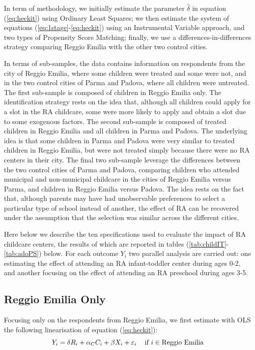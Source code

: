 \documentclass[12pt]{article}
\begin{document}
In term of methodology, we initially estimate the parameter $\hat{\delta}$ in equation (\ref{eq:heckit}) using Ordinary Least Squares; we then estimate the system of equations (\ref{eq:1stage}-\ref{eq:heckit}) using an Instrumental Variable approach, and two types of Propensity Score Matching; finally, we use a differences-in-differences strategy comparing Reggio Emilia with the other two control cities.

In terms of sub-samples, the data contains information on respondents from the city of Reggio Emilia, where some children were treated and some were not, and in the two control cities of Parma and Padova, where all children were untreated. The first sub-sample is composed of children in Reggio Emilia only. The identification strategy rests on the idea that, although all children could apply for a slot in the RA childcare, some were more likely to apply and obtain a slot due to some exogenous factors. The second sub-sample is composed of treated children in Reggio Emilia and all children in Parma and Padova. The underlying idea is that some children in Parma and Padova were very similar to treated children in Reggio Emilia, but were not treated simply because there were no RA centers in their city. The final two sub-sample leverage the differences between the two control cities of Parma and Padova, comparing children who attended municipal and non-municipal childcare in the cities of Reggio Emilia versus Parma, and children in Reggio Emilia versus Padova. The idea rests on the fact that, although parents may have had unobservable preferences to select a particular type of school instead of another, the effect of RA can be recovered under the assumption that the selection was similar across the different cities.

Here below we describe the ten specifications used to evaluate the impact of RA childcare centers, the results of which are reported in tables (\ref{tab:childIT}-\ref{tab:adoPS}) below. For each outcome $Y_{i}$ two parallel analysis are carried out: one estimating the effect of attending an RA infant-toddler center during ages 0-2, and another focusing on the effect of attending an RA preschool during ages 3-5.

\subsection{Reggio Emilia Only}

Focusing only on the respondents from Reggio Emilia, we first estimate with OLS the following linearisation of equation (\ref{eq:heckit}):
\begin{equation}
Y_{i} = \delta R_{i} + \alpha_{C} C_{i} + \beta X_{i} + \varepsilon_{i}    \hspace{2ex} \text{ if } i \in \text{Reggio Emilia} \label{eq1:OLSreggio}
\end{equation}
\end{document}
